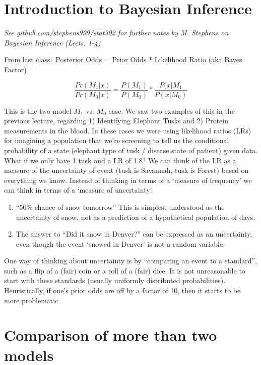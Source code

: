 \documentclass[12pt]{article}
\begin{document}
\section{Introduction to Bayesian Inference}

\emph{See github.com/stephens999/stat302 for further notes by M. Stephens on Bayesian Inference (Lects. 1-4)}

From last class:\
Posterior Odds = Prior Odds * Likelihood Ratio (aka Bayes Factor)

\[
\frac{Pr(M_1|x)}{Pr(M_0|x)} = \frac{P(M_1)}{P(M_0)} * \frac{P(x|M_1}{P(x|M_0)}
\]

This is the two model $M_1$ vs. $M_0$ case. We saw two examples of this in the previous lecture, regarding 1) Identifying Elephant Tusks and 2) Protein measurements in the blood. In these cases we were using likelihood ratios (LRs) for imagining a population that we're screening to tell us the conditional probability of a state (elephant type of tusk / disease state of patient) given data.\\

What if we only have 1 tusk and a LR of 1.8? We can think of the LR as a measure of the uncertainty of event (tusk is Savannah, tusk is Forest) based on everything we know. Instead of thinking in terms of a `measure of frequency' we can think in terms of a `measure of uncertainty'.\\

\begin{enumerate}
\item ``50\% chance of snow tomorrow'' This is simplest understood as the uncertainty of snow, not as a prediction of a hypothetical population of days.
\item The answer to ``Did it snow in Denver?'' can be expressed as an uncertainty, even though the event `snowed in Denver' is not a random variable.
\end{enumerate}

One way of thinking about uncertainty is by ``comparing an event to a standard'', such as a flip of a (fair) coin or a roll of a (fair) dice. It is not unreasonable to start with these standards (usually uniformly distributed probabilities). Heuristically, if one's prior odds are off by a factor of 10, then it starts to be more problematic.

\section{Comparison of more than two models}
\end{document}
